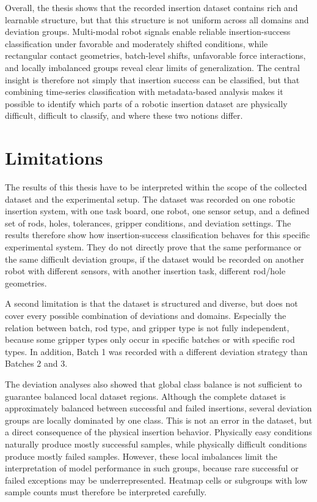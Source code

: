Overall, the thesis shows that the recorded insertion dataset contains rich and learnable structure, but that this structure is not uniform across all domains and deviation groups. Multi-modal robot signals enable reliable insertion-success classification under favorable and moderately shifted conditions, while rectangular contact geometries, batch-level shifts, unfavorable force interactions, and locally imbalanced groups reveal clear limits of generalization. The central insight is therefore not simply that insertion success can be classified, but that combining time-series classification with metadata-based analysis makes it possible to identify which parts of a robotic insertion dataset are physically difficult, difficult to classify, and where these two notions differ.


\section{Limitations}
\label{sec:limitations}

The results of this thesis have to be interpreted within the scope of the collected dataset and the experimental setup. The dataset was recorded on one robotic insertion system, with one task board, one robot, one sensor setup, and a defined set of rods, holes, tolerances, gripper conditions, and deviation settings. The results therefore show how insertion-success classification behaves for this specific experimental system. They do not directly prove that the same performance or the same difficult deviation groups, if the dataset would be recorded on another robot with different sensors, with another insertion task, different rod/hole geometries.

A second limitation is that the dataset is structured and diverse, but does not cover every possible combination of deviations and domains. Especially the relation between batch, rod type, and gripper type is not fully independent, because some gripper types only occur in specific batches or with specific rod types. In addition, Batch 1 was recorded with a different deviation strategy than Batches 2 and 3.

The deviation analyses also showed that global class balance is not sufficient to guarantee balanced local dataset regions. Although the complete dataset is approximately balanced between successful and failed insertions, several deviation groups are locally dominated by one class. This is not an error in the dataset, but a direct consequence of the physical insertion behavior. Physically easy conditions naturally produce mostly successful samples, while physically difficult conditions produce mostly failed samples. However, these local imbalances limit the interpretation of model performance in such groups, because rare successful or failed exceptions may be underrepresented. Heatmap cells or subgroups with low sample counts must therefore be interpreted carefully.

